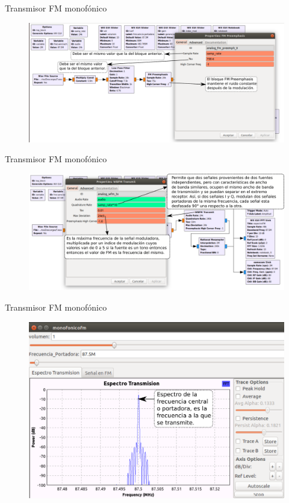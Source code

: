 \begin{frame}{Transmisor FM monofónico}

\begin{figure}[H]
\centering
\vspace{-3mm}
\includegraphics[width=\textwidth]{parte3/lab11/pdf/lab11_6.pdf}
\end{figure}

\end{frame}

\begin{frame}{Transmisor FM monofónico}

\begin{figure}[H]
\centering
\vspace{-3mm}
\includegraphics[width=\textwidth]{parte3/lab11/pdf/lab11_7.pdf}
\end{figure}

\end{frame}

\begin{frame}{Transmisor FM monofónico}

\begin{figure}[H]
\centering
\vspace{-3mm}
\includegraphics[width=.8\textwidth]{parte3/lab11/pdf/lab11_8.pdf}
\end{figure}

\end{frame}
